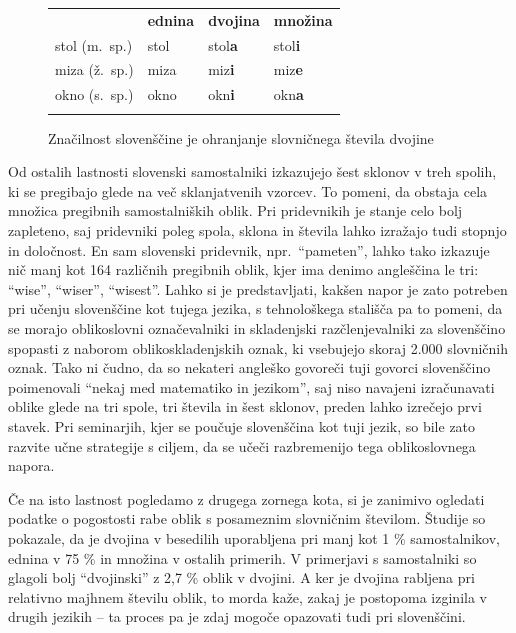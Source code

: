 \begin{multicols}{2}
\begin{figure}[htb]
\begin{tabularx}{\textwidth}{XXXX} \toprule\addlinespace
   & \textbf{ednina} & \textbf{dvojina} & \textbf{množina} \\ \addlinespace\midrule\addlinespace
  stol (m.~sp.)   & stol     &  stol\textbf{a}  & stol\textbf{i} \\ 
  miza (ž.~sp.)   & miza     &  miz\textbf{i}  & miz\textbf{e} \\ 
  okno (s.~sp.)   & okno     &  okn\textbf{i}  & okn\textbf{a} \\ \addlinespace\bottomrule
  \end{tabularx}
  \caption{Značilnost slovenščine je ohranjanje slovničnega števila dvojine}
  \label{fig:dvojina}
\end{figure}

Od ostalih lastnosti slovenski samostalniki izkazujejo šest sklonov v treh spolih, ki se pregibajo glede na več sklanjatvenih vzorcev. To po\-meni, da obstaja cela množica pregibnih samostalniških oblik. Pri pridevnikih je stanje celo bolj zapleteno, saj pridevniki poleg spola, sklona in števila lahko izražajo tudi stopnjo in določnost. En sam slovenski pridevnik, npr.~“pameten”, lahko tako izkazuje nič manj kot 164 različnih pregibnih oblik, kjer ima denimo angleščina le tri: ``wise'', ``wiser'', ``wisest''. Lahko si je predstav\-ljati, kakšen napor je zato potreben pri učenju slovenščine kot tujega jezika, s tehnološkega stališča pa to po\-meni, da se morajo oblikoslovni označevalniki in skladenjski razčlenjevalniki za slovenščino spopasti z naborom oblikoskladenjskih oznak, ki vsebujejo skoraj 2.000 slovničnih oznak. Tako ni čudno, da so nekateri angleško go\-voreči tuji go\-vorci slovenščino poimenovali “nekaj med matema\-tiko in jezikom”, saj niso navajeni izračunavati oblike glede na tri spole, tri števila in šest sklonov, preden lahko izrečejo prvi stavek. Pri seminarjih, kjer se poučuje slovenščina kot tuji jezik, so bile zato razvite učne strategije s ciljem, da se učeči razbremenijo tega oblikoslovnega napora. 

Če na isto lastnost pogledamo z drugega zornega kota, si je zanimivo ogledati podatke o pogostosti rabe oblik s posameznim slovničnim številom. Študije so pokazale, da je dvojina v besedilih uporab\-ljena pri manj kot 1 \% samostalnikov, ednina v 75 \% in množina v ostalih primerih. V primerjavi s samostalniki so glagoli bolj “dvojinski” z 2,7 \% oblik v dvojini. A ker je dvojina rab\-ljena pri relativno majhnem številu oblik, to morda kaže, zakaj je postopoma izginila v drugih jezikih – ta proces pa je zdaj mogoče opazovati tudi pri slovenščini.


\end{multicols}
